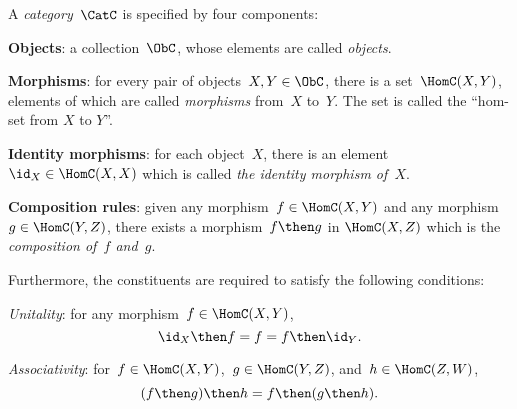 \begin{shaded*}
\begin{definition}[Category] \label{def:categorymain}
A \emph{category}~$\CatC$ is specified by four components:
\begin{compactenum}
\item \textbf{Objects}: a collection\footnotemark~$\ObC$, whose elements are called \emph{objects}.
\item \textbf{Morphisms}: for every pair of objects~$X,Y\in \ObC$, there is a set~$\HomC(X,Y)$, elements of which are called
\emph{morphisms} from~$X$ to~$Y$. The set is called the ``hom-set from $X$ to $Y$''.
\item \textbf{Identity morphisms}: for each object~$X$, there is
an element~$\id_X \in \HomC(X,X) $ which is called \emph{the identity
morphism of~$X$}.
\item \textbf{Composition rules}: given any morphism~$f \in  \HomC(X,Y)$ and any morphism~$g \in \HomC(Y, Z)$, there exists a morphism~$f\then g$ in $\HomC(X,Z)$ which is the \emph{composition of~$f$ and~$g$}.
\end{compactenum}

Furthermore, the constituents are required to satisfy the following conditions:
\begin{compactenum}
    \item \emph{Unitality}: for any morphism~$f\in\HomC(X,Y)$,
    \begin{equation}
        \id_X \then f= f = f \then \id_Y.
    \end{equation}
    \item \emph{Associativity}: for~$f\in \HomC(X,Y)$,~$g\in \HomC(Y,Z)$, and~$h\in \HomC(Z,W)$,
    \begin{equation}
        (f\then g)\then h= f \then (g \then h).
    \end{equation}
\end{compactenum}
\end{definition}
\end{shaded*}


